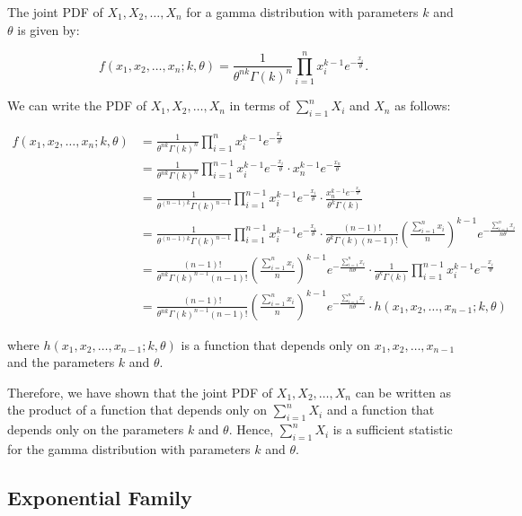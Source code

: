 \documentclass[11pt]{article}
\begin{document}
The joint PDF of $X_1, X_2, \ldots, X_n$ for a gamma distribution with parameters $k$ and $\theta$ is given by:

$$ f(x_1,x_2,\ldots,x_n;k,\theta) = \frac{1}{\theta^{nk}\Gamma(k)^n} \prod_{i=1}^{n} x_i^{k-1} e^{-\frac{x_i}{\theta}}. $$

We can write the PDF of $X_1, X_2, \ldots, X_n$ in terms of $\sum_{i=1}^{n} X_i$ and $X_n$ as follows:

\begin{align*}
    f(x_1,x_2,\ldots,x_n;k,\theta) &= \frac{1}{\theta^{nk}\Gamma(k)^n} \prod_{i=1}^{n} x_i^{k-1} e^{-\frac{x_i}{\theta}} \\
    &= \frac{1}{\theta^{nk}\Gamma(k)^n} \prod_{i=1}^{n-1} x_i^{k-1} e^{-\frac{x_i}{\theta}} \cdot x_n^{k-1} e^{-\frac{x_n}{\theta}} \\
    &= \frac{1}{\theta^{(n-1)k}\Gamma(k)^{n-1}} \prod_{i=1}^{n-1} x_i^{k-1} e^{-\frac{x_i}{\theta}} \cdot \frac{x_n^{k-1} e^{-\frac{x_n}{\theta}}}{\theta^k\Gamma(k)} \\
    &= \frac{1}{\theta^{(n-1)k}\Gamma(k)^{n-1}} \prod_{i=1}^{n-1} x_i^{k-1} e^{-\frac{x_i}{\theta}} \cdot \frac{(n-1)!}{\theta^k\Gamma(k)(n-1)!} \left(\frac{\sum_{i=1}^{n} x_i}{n}\right)^{k-1} e^{-\frac{\sum_{i=1}^{n} x_i}{n\theta}} \\
    &= \frac{(n-1)!}{\theta^{nk}\Gamma(k)^{n-1}(n-1)!} \left(\frac{\sum_{i=1}^{n} x_i}{n}\right)^{k-1} e^{-\frac{\sum_{i=1}^{n} x_i}{n\theta}} \cdot \frac{1}{\theta^{k}\Gamma(k)} \prod_{i=1}^{n-1} x_i^{k-1} e^{-\frac{x_i}{\theta}} \\
    &= \frac{(n-1)!}{\theta^{nk}\Gamma(k)^{n-1}(n-1)!} \left(\frac{\sum_{i=1}^{n} x_i}{n}\right)^{k-1} e^{-\frac{\sum_{i=1}^{n} x_i}{n\theta}} \cdot h(x_1,x_2,\ldots,x_{n-1};k,\theta)
\end{align*}

where $h(x_1,x_2,\ldots,x_{n-1};k,\theta)$ is a function that depends only on $x_1,x_2,\ldots,x_{n-1}$ and the parameters $k$ and $\theta$.

Therefore, we have shown that the joint PDF of $X_1, X_2, \ldots, X_n$ can be written as the product of a function that depends only on $\sum_{i=1}^{n} X_i$ and a function that depends only on the parameters $k$ and $\theta$. Hence, $\sum_{i=1}^{n} X_i$ is a sufficient statistic for the gamma distribution with parameters $k$ and $\theta$.

\subsection*{Exponential Family}
\end{document}
